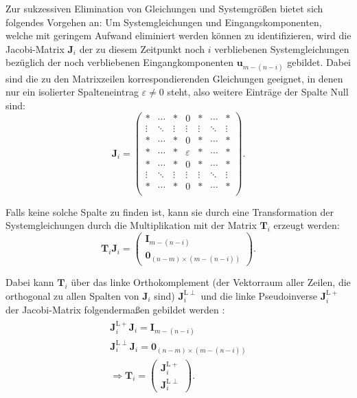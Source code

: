 Zur sukzessiven Elimination von Gleichungen und Systemgrößen bietet sich folgendes Vorgehen an: Um Systemgleichungen und Eingangskomponenten, welche mit geringem Aufwand eliminiert werden können zu identifizieren, wird die Jacobi-Matrix $\mathbf{J}_i$ der zu diesem Zeitpunkt noch $i$ verbliebenen Systemgleichungen bezüglich der noch verbliebenen Eingangkomponenten $\mathbf{u}_{m-(n-i)}$ gebildet. Dabei sind die zu den Matrixzeilen korrespondierenden Gleichungen geeignet, in denen nur ein isolierter Spalteneintrag $\varepsilon \neq 0$ steht, also weitere Einträge der Spalte Null sind:
\begin{equation}
	\mathbf{J}_i = 
	\begin{pmatrix}
	* & \cdots & * & 0 & * & \cdots & *\\
	\vdots & \ddots & \vdots & \vdots & \vdots & \ddots & \vdots \\
	* & \cdots & * & 0 & * & \cdots & *  \\
	* & \cdots & * & \varepsilon & * & \cdots & * \\
	* & \cdots & * & 0 & * & \cdots & *  \\
	\vdots & \ddots & \vdots & \vdots & \vdots & \ddots & \vdots \\
	* & \cdots & * & 0 & * & \cdots & *\\
	\end{pmatrix}.
\end{equation}

Falls keine solche Spalte zu finden ist, kann sie durch eine Transformation der Systemgleichungen durch die Multiplikation mit der Matrix $\mathbf{T}_i$ erzeugt werden:
\begin{equation}
	\mathbf{T}_i \mathbf{J}_i = 
	\begin{pmatrix}
		\mathbf{I}_{m-(n-i)} \\
		\mathbf{0}_{(n-m) \times (m-(n-i))}
	\end{pmatrix}.
\end{equation}

Dabei kann $\mathbf{T}_i$ über das linke Orthokomplement (der Vektorraum aller Zeilen, die orthogonal zu allen Spalten von $\mathbf{J}_i$ sind) $\mathbf{J}_i^{\mathrm{L} \perp}$ und die linke Pseudoinverse $\mathbf{J}_i^{\mathrm{L} +}$ der Jacobi-Matrix folgendermaßen gebildet werden \cite[Abschnitt 2.1.2]{Fritzsche2016}:
\begin{align}
	\label{eq:flatness_trafo}
	\begin{split}
	\mathbf{J}_i^{\mathrm{L} +} \mathbf{J}_i = \mathbf{I}_{m-(n-i)} \\
	\mathbf{J}_i^{\mathrm{L} \perp} \mathbf{J}_i = \mathbf{0}_{(n-m) \times (m-(n-i))} \\
	\Rightarrow \mathbf{T}_i = 
	\begin{pmatrix}
		\mathbf{J}_i^{\mathrm{L} +} \\
		\mathbf{J}_i^{\mathrm{L} \perp}
	\end{pmatrix} .
	\end{split}
\end{align}


